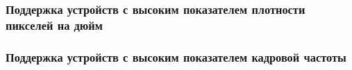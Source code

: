 \subsubsection*{Поддержка устройств с высоким показателем плотности пикселей на дюйм}


\subsubsection*{Поддержка устройств с высоким показателем кадровой частоты}

